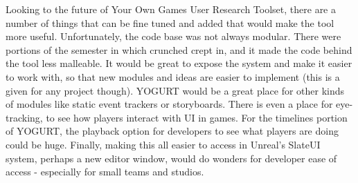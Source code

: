 \documentclass[journal]{IEEEtran}
\begin{document}
Looking to the future of Your Own Games User Research Toolset, there are a number of things that can be fine tuned and added that would make the tool more useful. Unfortunately, the code base was not always modular. There were portions of the semester in which crunched crept in, and it made the code behind the tool less malleable. It would be great to expose the system and make it easier to work with, so that new modules and ideas are easier to implement (this is a given for any project though). YOGURT would be a great place for other kinds of modules like static event trackers or storyboards. There is even a place for eye-tracking, to see how players interact with UI in games. For the timelines portion of YOGURT, the playback option for developers to see what players are doing could be huge. Finally, making this all easier to access in Unreal’s SlateUI system, perhaps a new editor window, would do wonders for developer ease of access - especially for small teams and studios.


%
%

\end{document}
